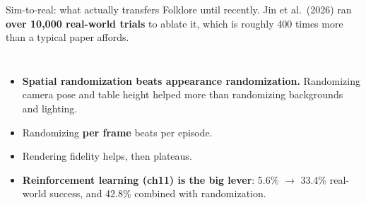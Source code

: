 \documentclass[aspectratio=169]{beamer}
\begin{document}
\begin{frame}{Sim-to-real: what actually transfers}
  \small
  Folklore until recently. Jin et al.\ (2026) ran \textbf{over 10,000 real-world trials} to
  ablate it, which is roughly 400 times more than a typical paper affords.
  \vskip 8pt
  \begin{columns}[T]
    \footnotesize
    \begin{itemize}\itemsep 3pt
      \item \textbf{Spatial randomization beats appearance randomization.} Randomizing
        camera pose and table height helped more than randomizing backgrounds and lighting.
      \item Randomizing \textbf{per frame} beats per episode.
      \item Rendering fidelity helps, then plateaus.
      \item \textbf{Reinforcement learning (ch11) is the big lever}: 5.6\% $\rightarrow$
        33.4\% real-world success, and 42.8\% combined with randomization.
    \end{itemize}
    \vskip 6pt
  \end{columns}
\end{frame}
\end{document}
